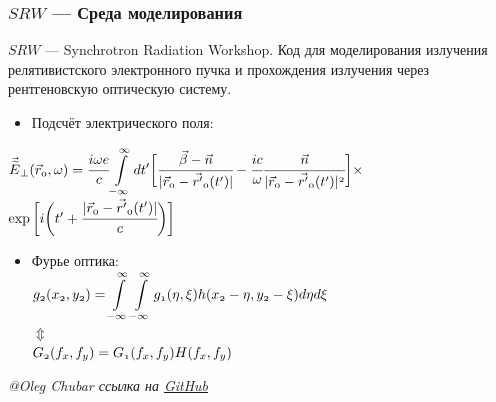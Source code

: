 \documentclass[14pt, hyperref = {colorlinks},xcolor=table ]{beamer}
\begin{document}
\small
\begin{frame}
\frametitle{$SRW$ --- Среда моделирования}\label{t1}
$SRW$ --- Synchrotron Radiation Workshop. Код для моделирования излучения релятивистского электронного пучка и прохождения излучения через рентгеновскую оптическую систему.
\begin{itemize}
	\item Подсчёт электрического поля:\\
\end{itemize}
	\hspace{25pt}$\mathnormal{\vec{\widetilde{E}}_{\bot}(\vec{r}_0, \omega) = 
	\cfrac{i\omega e}{c}\displaystyle\int\limits_{-\infty}^{\infty} dt'\bigg[\cfrac{\vec{\beta} - \vec{n}}{|\vec{r}_0 - \vec{r'}_0(t')|} - \cfrac{ic}{\omega}\cfrac{\vec{n}}{|\vec{r}_0 - \vec{r'}_0(t')|^2}\bigg]\times}$\\
	\hspace{195pt}$\mathnormal{\exp\bigg[i\bigg(t' + \cfrac{|\vec{r}_0 - \vec{r'}_0(t')|}{c}\bigg)\bigg]}$
\vspace{-10pt}
\begin{itemize}	
	\item Фурье оптика:\\
	\centering
	\vspace{-10pt}
	$\mathnormal{g_2(x_2, y_2) = \displaystyle\int\limits_{-\infty}^{\infty}\displaystyle\int\limits_{-\infty}^{\infty}
		g_1(\eta, \xi) h(x_2 - \eta, y_2 - \xi)}d\eta d\xi$ \\
	\vspace{-6pt}
	$\Updownarrow$\\
	\vspace{6pt}
	$\mathnormal{G_2(f_x, f_y) = G_1(f_x, f_y)H(f_x, f_y)}$
\end{itemize}
\tiny{\textit{@Oleg Chubar ссылка на \href{https://github.com/ochubar/SRW.git}{GitHub}}}
\end{frame}
\end{document}
